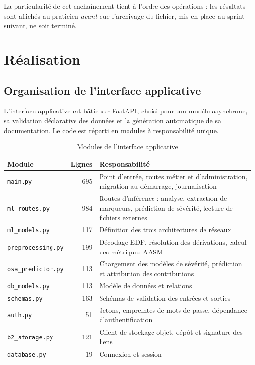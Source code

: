 La particularité de cet enchaînement tient à l'ordre des opérations : les résultats sont
affichés au praticien \emph{avant} que l'archivage du fichier, mis en place au sprint
suivant, ne soit terminé.

\section{Réalisation}

\subsection{Organisation de l'interface applicative}

L'interface applicative est bâtie sur FastAPI, choisi pour son modèle asynchrone, sa
validation déclarative des données et la génération automatique de sa documentation. Le
code est réparti en modules à responsabilité unique.

\begin{table}[H]
\centering

\small
\begin{tabular}{@{}lrL{8.3cm}@{}}
\toprule
\textbf{Module} & \textbf{Lignes} & \textbf{Responsabilité} \\
\midrule
\texttt{main.py}          & 695 & Point d'entrée, routes métier et d'administration,
                                  migration au démarrage, journalisation \\
\texttt{ml\_routes.py}    & 984 & Routes d'inférence : analyse, extraction de
                                  marqueurs, prédiction de sévérité, lecture de
                                  fichiers externes \\
\texttt{ml\_models.py}    & 117 & Définition des trois architectures de réseaux \\
\texttt{preprocessing.py} & 199 & Décodage EDF, résolution des dérivations, calcul
                                  des métriques AASM \\
\texttt{osa\_predictor.py}& 113 & Chargement des modèles de sévérité, prédiction et
                                  attribution des contributions \\
\texttt{db\_models.py}    & 113 & Modèle de données et relations \\
\texttt{schemas.py}       & 163 & Schémas de validation des entrées et sorties \\
\texttt{auth.py}          &  51 & Jetons, empreintes de mots de passe, dépendance
                                  d'authentification \\
\texttt{b2\_storage.py}   & 121 & Client de stockage objet, dépôt et signature des
                                  liens \\
\texttt{database.py}      &  19 & Connexion et session \\
\bottomrule
\end{tabular}
\caption{Modules de l'interface applicative}
\label{tab:modules}
\end{table}

